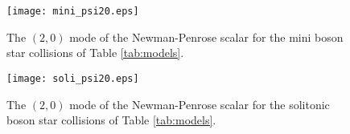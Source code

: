 \documentclass[]{iopart}
\begin{document}
%
%
\begin{figure}
    \centering
    \texttt{[image: mini\_psi20.eps]}
    \caption{The $(2,0)$ mode of the Newman-Penrose scalar
    for the mini boson star collisions of Table \ref{tab:models}.
    }
    \label{fig:mini_psi20}
\end{figure}
%
%
\begin{figure}
    \centering
    \texttt{[image: soli\_psi20.eps]}
    \caption{The $(2,0)$ mode of the Newman-Penrose scalar
    for the solitonic boson star collisions of Table \ref{tab:models}.
    }
    \label{fig:soli_psi20}
\end{figure}
%

\end{document}
